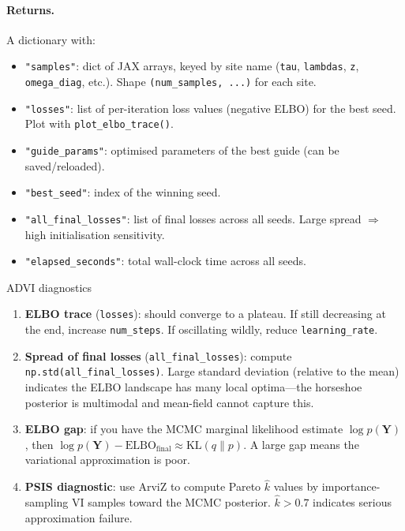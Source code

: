 \documentclass[11pt,a4paper]{article}
\begin{document}
\paragraph{Returns.} A dictionary with:
\begin{itemize}[nosep]
  \item \texttt{"samples"}: dict of JAX arrays, keyed by site name (\texttt{tau}, \texttt{lambdas}, \texttt{z}, \texttt{omega\_diag}, etc.). Shape \texttt{(num\_samples, ...)} for each site.
  \item \texttt{"losses"}: list of per-iteration loss values (negative ELBO) for the best seed. Plot with \texttt{plot\_elbo\_trace()}.
  \item \texttt{"guide\_params"}: optimised parameters of the best guide (can be saved/reloaded).
  \item \texttt{"best\_seed"}: index of the winning seed.
  \item \texttt{"all\_final\_losses"}: list of final losses across all seeds. Large spread $\Rightarrow$ high initialisation sensitivity.
  \item \texttt{"elapsed\_seconds"}: total wall-clock time across all seeds.
\end{itemize}

\begin{outputguide}{ADVI diagnostics}
\begin{enumerate}[nosep]
  \item \textbf{ELBO trace} (\texttt{losses}): should converge to a plateau. If still decreasing at the end, increase \texttt{num\_steps}. If oscillating wildly, reduce \texttt{learning\_rate}.
  \item \textbf{Spread of final losses} (\texttt{all\_final\_losses}): compute \texttt{np.std(all\_final\_losses)}. Large standard deviation (relative to the mean) indicates the ELBO landscape has many local optima---the horseshoe posterior is multimodal and mean-field cannot capture this.
  \item \textbf{ELBO gap}: if you have the MCMC marginal likelihood estimate $\log p(\bm{Y})$, then $\log p(\bm{Y}) - \text{ELBO}_{\text{final}} \approx \text{KL}(q \| p)$. A large gap means the variational approximation is poor.
  \item \textbf{PSIS diagnostic}: use ArviZ to compute Pareto $\hat{k}$ values by importance-sampling VI samples toward the MCMC posterior. $\hat{k} > 0.7$ indicates serious approximation failure.
\end{enumerate}
\end{outputguide}
\end{document}
